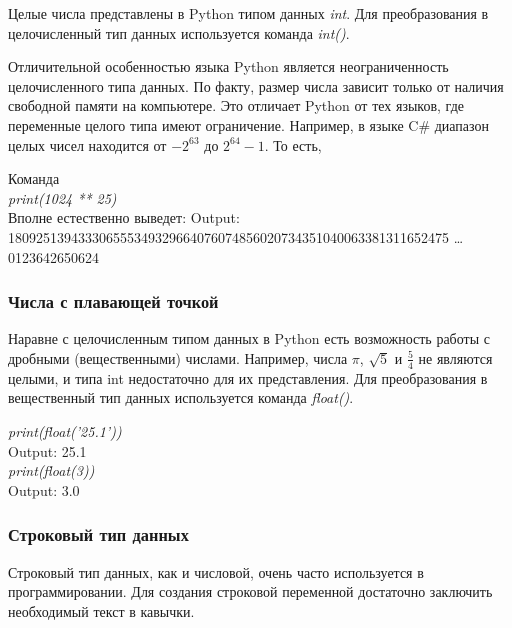 Целые числа представлены в Python типом данных \textit{int}. Для преобразования в целочисленный тип данных используется команда \colorbox[rgb]{0.95, 0.95, 0.95}{\textit{int()}}. 

Отличительной особенностью языка Python является неограниченность целочисленного типа данных. По факту, размер числа зависит только от наличия свободной памяти на компьютере. Это отличает Python от тех языков, где переменные целого типа имеют ограничение. Например, в языке C\# диапазон целых чисел находится от $-2^{63}$ до $2^{64} - 1$. То есть,

\begin{flushleft}
	Команда \\
	\colorbox[rgb]{0.95, 0.95, 0.95}{\textit{print(1024 ** 25)}} \\
	Вполне естественно выведет:
	\colorbox[rgb]{0.95, 0.95, 0.95}{Output: 180925139433306555349329664076074856020734351040063381311652475 \ldots 0123642650624}
\end{flushleft}

\subsubsection{Числа с плавающей точкой}

Наравне с целочисленным типом данных в Python есть возможность работы с дробными (вещественными) числами. Например, числа $\pi$, $\sqrt{5}$ и $\frac{5}{4}$ не являются целыми, и типа int недостаточно для их представления. Для преобразования в вещественный тип данных используется команда \colorbox[rgb]{0.95, 0.95, 0.95}{\textit{float()}}.

\begin{flushleft}
	\colorbox[rgb]{0.95, 0.95, 0.95}{\textit{print(float('25.1'))}} \\
	\colorbox[rgb]{0.95, 0.95, 0.95}{Output: 25.1} \\
	\vspace{1cm}
	\colorbox[rgb]{0.95, 0.95, 0.95}{\textit{print(float(3))}} \\
	\colorbox[rgb]{0.95, 0.95, 0.95}{Output: 3.0}
\end{flushleft}

\subsubsection{Строковый тип данных}

Строковый тип данных, как и числовой, очень часто используется в программировании. Для создания строковой переменной достаточно заключить необходимый текст в кавычки.


